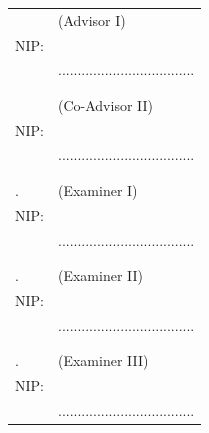 \noindent
\begin{tabularx}{\textwidth}{X l}
  \advisor{}             & (Advisor I)                         \\
  NIP: \advisornip{}     &                                     \\
                         & ................................... \\
                         &                                     \\
                         &                                     \\
  \coadvisor{}           & (Co-Advisor II)                     \\
  NIP: \coadvisornip{}   &                                     \\
                         & ................................... \\
                         &                                     \\
                         &                                     \\
  \examinerone{}.        & (Examiner I)                        \\
  NIP: \examineronenip{} &                                     \\
                         & ................................... \\
                         &                                     \\
                         &                                     \\
  \examinertwo{}.        & (Examiner II)                       \\
  NIP: \examinertwonip{} &                                     \\
                         & ................................... \\
                         &                                     \\
                         &                                     \\

  \examinerthree{}.        & (Examiner III)                       \\
  NIP: \examinerthreenip{} &                                     \\
                          & ................................... \\


\end{tabularx}
\endgroup

